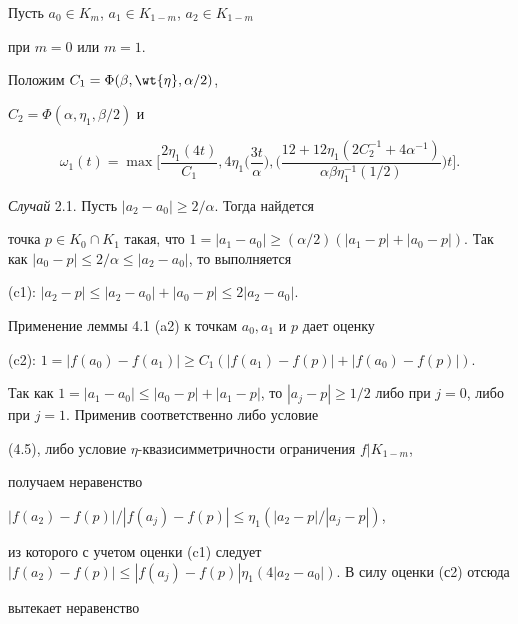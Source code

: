 \begin{pf}
Пусть $a_0 \in K_m$, $a_1 \in K_{1-m}$, $a_2 \in K_{1-m}$ 


при $m=0$ или $m=1$. 


Положим $C_1=\Phi(\beta, \wt{\eta}, \alpha/2)$, 


$C_2=\Phi(\alpha, \eta_1, \beta/2)$ и 


$$


\omega_1(t)=\max \bigg[ \frac{2\eta_1(4t)}{C_1}, 4\eta_1\bigg( 


\frac{3t}{\alpha} \bigg) , \bigg( \frac{12+12\eta_1(2C_2^{-1}+4\alpha^{-1})}


{\alpha \beta \eta_1^{-1}(1/2)}\bigg) t \bigg].


$$





{\it Случай} 2.1. Пусть $|a_2-a_0| \geq 2/\alpha$. Тогда найдется 


точка $p\in K_0\cap K_1$ такая, что $1=|a_1 -a_0| \geq (\alpha/2) 


(|a_1-p|+|a_0-p|)$. Так как $|a_0-p| \leq 2/\alpha 


\leq |a_2-a_0|$, то выполняется





(c1): $|a_2-p| \leq |a_2-a_0|+|a_0-p| \leq 2|a_2-a_0|$. 





\noindent{}Применение леммы 4.1 (a2) к точкам $a_0, a_1$ и $p$ дает оценку 





(c2): $1=|f(a_0)-f(a_1)| \geq C_1(|f(a_1)-f(p)|+|f(a_0)-f(p)|)$.





\noindent{}Так как $1=|a_1-a_0| \leq |a_0-p|+|a_1-p|$, то $|a_j-p| \geq 


1/2$ либо при $j=0$, либо при $j=1$. Применив соответственно либо условие 


(4.5), либо условие $\eta$-{}квазисимметричности ограничения $f|K_{1-m}$, 


получаем неравенство 


$|f(a_2)-f(p)|/|f(a_j)-f(p)| \leq \eta_1(|a_2-p|/|a_j-p|)$, 


из которого с учетом оценки (c1) следует $|f(a_2)-f(p)| \leq 


|f(a_j)-f(p)|\eta_1(4|a_2-a_0|)$. В силу оценки (с2) отсюда 


вытекает неравенство






\end{pf}
